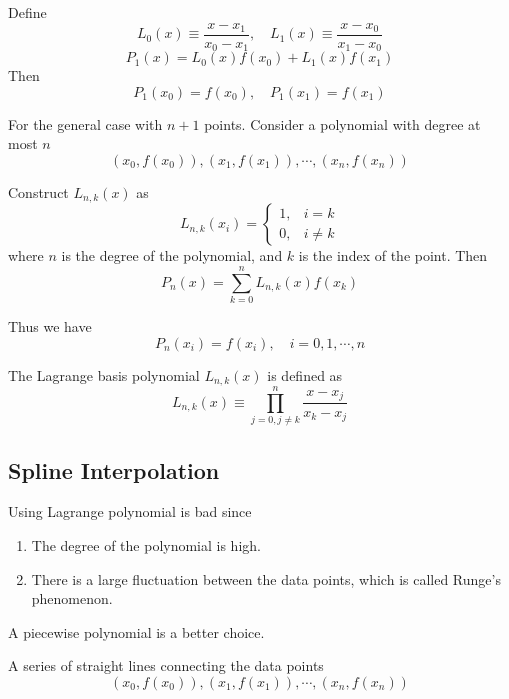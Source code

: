 Define \[
    L_0(x) \equiv \frac{x-x_1}{x_0 - x_1}, \quad L_1(x) \equiv \frac{x-x_0}{x_1 - x_0}
\]
\[
    P_1(x) = L_0(x) f(x_0) + L_1(x) f(x_1)
\]
Then \[
    P_1(x_0) = f(x_0), \quad P_1(x_1) = f(x_1)
\]

\begin{eg}
    For the general case with $n+1$ points. Consider a polynomial with degree at most $n$ \[
        (x_0, f(x_0)), (x_1, f(x_1)), \cdots, (x_n, f(x_n))
    \]
\end{eg}

\begin{definition}
    Construct $L_{n,k}(x)$ as \[
        L_{n,k}(x_i) = \begin{cases}
            1, & i = k \\
            0, & i \neq k
        \end{cases}
    \]
    where $n$ is the degree of the polynomial, and $k$ is the index of the point. Then \[
        P_n(x) = \sum_{k=0}^n L_{n,k}(x) f(x_k)
    \]
\end{definition}

Thus we have \[
    P_n(x_i) = f(x_i), \quad i = 0,1,\cdots,n
\]

\begin{definition}
    The Lagrange basis polynomial $L_{n,k}(x)$ is defined as \[
        L_{n,k}(x) \equiv \prod_{j=0, j \neq k}^n \frac{x-x_j}{x_k - x_j}
    \]
\end{definition}

\subsection{Spline Interpolation}

Using Lagrange polynomial is bad since \begin{enumerate}
    \item The degree of the polynomial is high.
    \item There is a large fluctuation between the data points, which is called Runge's phenomenon.
\end{enumerate}

A piecewise polynomial is a better choice.

\begin{definition}
    A series of straight lines connecting the data points \[
        (x_0, f(x_0)), (x_1, f(x_1)), \cdots, (x_n, f(x_n))
    \]
\end{definition}

